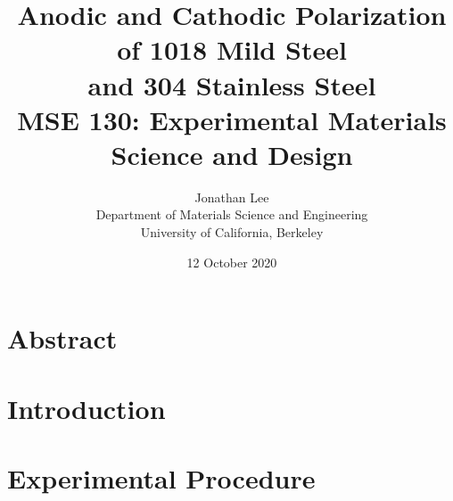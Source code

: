 \documentclass[12pt, titlepage]{article}
\title{\Large Anodic and Cathodic Polarization of 1018 Mild Steel \\
		and 304 Stainless Steel \\
		\bigskip
	\normalsize MSE 130: Experimental Materials Science and Design}
\author{\normalsize Jonathan Lee \\
	\normalsize Department of Materials Science and Engineering \\
	\normalsize University of California, Berkeley}
\date{\normalsize 12 October 2020}
\begin{document}
\maketitle

\doublespacing

\setcounter{page}{2}

\tableofcontents

\newpage

\section{Abstract}

\section{Introduction}



\section{Experimental Procedure}

% 

\begin{table}[h!]
	\centering
	
\end{table}

\begin{table}[h!]
	\centering
	
\end{table}

\begin{table}[h!]
	\centering
	
\end{table}

\begin{table}[h!]
	\centering
	
\end{table}

\begin{table}[h!]
	\centering
	
\end{table}

\begin{table}[h!]
	\centering
	
\end{table}

\begin{table}[h!]
	\centering
	
\end{table}
\end{document}
